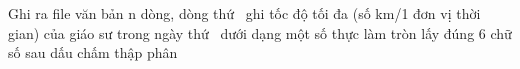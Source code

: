 Ghi ra file văn bản n dòng, dòng thứ     ghi tốc độ tối đa (số km/1 đơn vị thời gian) của giáo sư trong ngày thứ     dưới dạng một số thực làm tròn lấy đúng 6 chữ số sau dấu chấm thập phân  

\